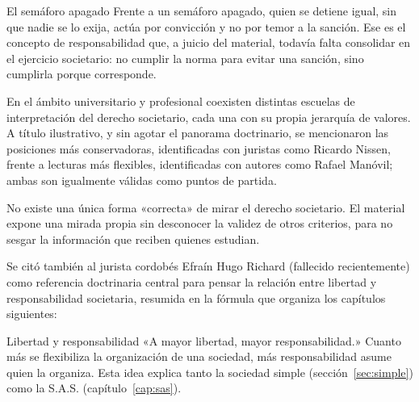 \documentclass[12pt,oneside]{book}
\begin{document}
\begin{example}{El semáforo apagado}
Frente a un semáforo apagado, quien se detiene igual, sin que nadie se lo exija, actúa por convicción y no por temor a la sanción. Ese es el concepto de responsabilidad que, a juicio del material, todavía falta consolidar en el ejercicio societario: no cumplir la norma para evitar una sanción, sino cumplirla porque corresponde.
\end{example}

En el ámbito universitario y profesional coexisten distintas escuelas de interpretación del derecho societario, cada una con su propia jerarquía de valores. A título ilustrativo, y sin agotar el panorama doctrinario, se mencionaron las posiciones más conservadoras, identificadas con juristas como Ricardo Nissen, frente a lecturas más flexibles, identificadas con autores como Rafael Manóvil; ambas son igualmente válidas como puntos de partida.

\begin{important}
No existe una única forma «correcta» de mirar el derecho societario. El material expone una mirada propia sin desconocer la validez de otros criterios, para no sesgar la información que reciben quienes estudian.
\end{important}

Se citó también al jurista cordobés Efraín Hugo Richard (fallecido recientemente) como referencia doctrinaria central para pensar la relación entre libertad y responsabilidad societaria, resumida en la fórmula que organiza los capítulos siguientes:

\begin{concept}{Libertad y responsabilidad}
«A mayor libertad, mayor responsabilidad.» Cuanto más se flexibiliza la organización de una sociedad, más responsabilidad asume quien la organiza. Esta idea explica tanto la sociedad simple (sección~\ref{sec:simple}) como la S.A.S. (capítulo~\ref{cap:sas}).
\end{concept}
\end{document}
